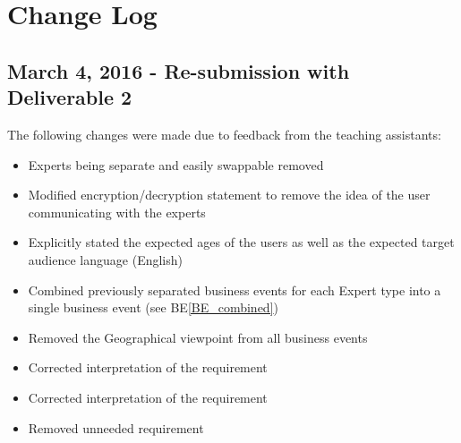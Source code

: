 \documentclass[titlepage]{article}
\begin{document}

\color{red}
\section{Change Log}
\label{sec:change_log}

\subsection{March 4, 2016 - Re-submission with Deliverable 2}
\label{sub:d2}

The following changes were made due to feedback from the teaching assistants:
\begin{itemize}
    \item \textbf{} Experts being separate and easily swappable
    removed
    \item \textbf{} Modified encryption/decryption statement to
    remove the idea of the user communicating with the experts
    \item \textbf{} Explicitly stated the expected ages of the
    users as well as the expected target audience language (English)
    \item \textbf{} Combined previously separated business
    events for each Expert type into a single business event (see BE\ref{BE_combined})
    \item \textbf{} Removed the Geographical viewpoint from all
    business events
    \item \textbf{} Corrected interpretation of the requirement
    \item \textbf{} Corrected interpretation of the requirement
    \item \textbf{} Removed unneeded requirement
\end{itemize}


\color{black}
\end{document}
